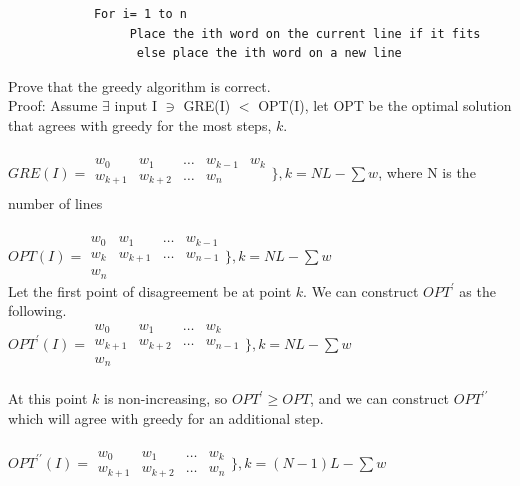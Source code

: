\documentclass[10pt]{article}
\begin{document}
			\begin{verbatim}
			For i= 1 to n
			     Place the ith word on the current line if it fits
			      else place the ith word on a new line
			\end{verbatim}
			Prove that the greedy algorithm is correct.\\
			Proof: Assume $\exists$ input I $\ni$ GRE(I) $<$ OPT(I), let OPT be the optimal solution that agrees with greedy
			for the most steps, $k$.\\
			\\
			$GRE(I) = 
			\begin{array}{ccccc}
				w_{0} & w_{1} & \ldots & w_{k-1} & w_{k}\\
				w_{k+1} & w_{k+2} & \ldots & w_{n}\\  
			\end{array}\bigg\}, k = N L - \sum w$, where N is the number of lines
			\\
			\\
			$OPT(I) = 
			\begin{array}{ccccc}
				w_{0} & w_{1} & \ldots & w_{k-1}\\
				w_{k} & w_{k+1} & \ldots & w_{n-1}\\
				w_{n}  
			\end{array}\bigg\}, k = N L - \sum w$\\
			Let the first point of disagreement be at point $k$. We can construct $OPT^{\prime}$ as the following.\\
			$OPT^{\prime}(I) = 
			\begin{array}{ccccc}
				w_{0} & w_{1} & \ldots & w_{k}\\
				w_{k+1} & w_{k+2} & \ldots & w_{n-1}\\
				w_{n}  
			\end{array}\bigg\}, k = N L - \sum w$\\
			\\
			At this point $k$ is non-increasing, so $OPT^{\prime} \geq OPT$, and we can construct $OPT^{\prime\prime}$ which
			will agree with greedy for an additional step.\\
			\\
			$OPT^{\prime\prime}(I) = 
			\begin{array}{ccccc}
				w_{0} & w_{1} & \ldots & w_{k}\\
				w_{k+1} & w_{k+2} & \ldots & w_{n}
			\end{array}\bigg\}, k = (N - 1) L - \sum w$\\
			\\	
\end{document}
